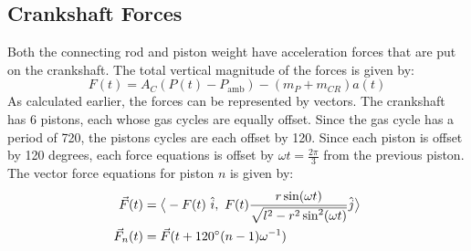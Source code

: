 \documentclass[10pt,a4paper]{article}
\begin{document}
\subsection*{Crankshaft Forces}
Both the connecting rod and piston weight have acceleration forces that are put on the crankshaft. The total vertical magnitude of the forces is given by:
$$F(t) = A_C (P(t) - P_{\text{amb}}) - (m_P+m_{CR})a(t)$$
As calculated earlier, the forces can be represented by vectors. The crankshaft has 6 pistons, each whose gas cycles are equally offset. Since the gas cycle has a period of 720\degree , the pistons cycles are each offset by 120\degree . Since each piston is offset by 120 degrees, each force equations is offset by $\omega t = \frac{2 \pi}{3}$ from the previous piston. The vector force equations for piston $n$ is given by:
\begin{align*}
\vec{F}(t) &= \big \langle -F(t)\ \hat{i},\ F(t) \frac{r \sin(\omega t)}{\sqrt{l^2 - r^2 \sin^2(\omega t)}}  \hat{j} \big \rangle\\
\vec{F}_n(t) &= \vec{F}(t + 120 \degree (n-1)\omega^{-1})
\end{align*} 
\end{document}

